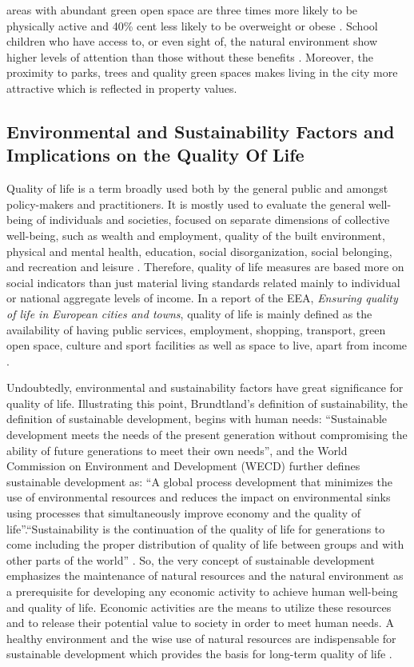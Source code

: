 \documentclass[10pt,a4paper]{article}
\begin{document}
\begin{multicols}{2}
areas with abundant green open space are three times more likely to be physically active and 40\% cent less likely to be overweight or obese \citep{r17}. School children who have access to, or even sight of, the natural environment show higher levels of attention than those without these benefits \citep{r18}. Moreover, the proximity to parks, trees and quality green spaces makes living in the city more attractive which is reflected in property values.

\subsection{Environmental and Sustainability Factors and Implications on the Quality Of Life}
\noindent Quality of life is a term broadly used both by the general public and amongst policy-makers and practitioners. It is mostly used to evaluate the general well-being of individuals and societies, focused on separate dimensions of collective well-being, such as wealth and employment, quality of the built environment, physical and mental health, education, social disorganization, social belonging, and recreation and leisure \citep{r19}. Therefore, quality of life measures are based more on social indicators than just material living standards related mainly to individual or national aggregate levels of income. In a report of the EEA, \textit{Ensuring quality of life in European cities and towns}, quality of life is mainly defined as the availability of having public services, employment, shopping, transport, green open space, culture and sport facilities as well as space to live, apart from income \citep{r20}.

Undoubtedly, environmental and sustainability factors have great significance for quality of life. Illustrating this point, Brundtland's definition of sustainability, the definition of sustainable development, begins with human needs: ``Sustainable development meets the needs of the present generation without compromising the ability of future generations to meet their own needs'', and the World Commission on Environment and Development (WECD) further defines sustainable development as: ``A global process development that minimizes the use of environmental resources and reduces the impact on environmental sinks using processes that simultaneously improve economy and the quality of life''.``Sustainability is the continuation of the quality of life for generations to come including the proper distribution of quality of life between groups and with other parts of the world'' \citep{r21}. So, the very concept of sustainable development emphasizes the maintenance of natural resources and the natural environment as a prerequisite for developing any economic activity to achieve human well-being and quality of life. Economic activities are the means to utilize these resources and to release their potential value to society in order to meet human needs. A healthy environment and the wise use of natural resources are indispensable for sustainable development which provides the basis for long-term quality of life \citep{r22}.


\end{multicols}
\end{document}
